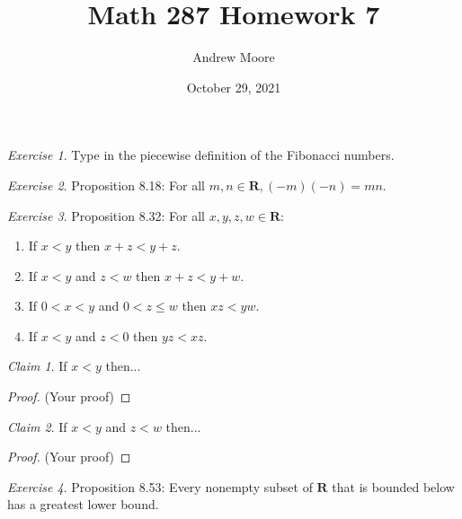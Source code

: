 \documentclass[12pt,oneside]{amsart}
\title{Math 287 Homework 7}
\author{Andrew Moore}
\date{October 29, 2021} %
\theoremstyle{remark}
\newtheorem{exer}{Exercise}
\newtheorem{claim}{Claim}[exer]
\newcommand{\bfR}{\mathbf{R}}
\begin{document}
\maketitle

\begin{exer}
Type in the piecewise definition of the Fibonacci numbers.
\end{exer}

\newpage
\begin{exer}
Proposition 8.18: For all $m,n \in \bfR, (-m)(-n) = mn$.
\end{exer}

\newpage
\begin{exer}
Proposition 8.32: For all $x,y,z,w \in \bfR$:
\begin{enumerate}
  \item If $x < y$ then $x + z < y + z$.
  \item If $x < y$ and $z < w$ then $x + z < y + w$.
  \item If $0 < x < y$ and $0 < z \leq w$ then $xz < yw$.
  \item If $x < y$ and $z < 0$ then $yz < xz$.
\end{enumerate}

\end{exer}

\begin{claim}
If $x < y$ then...
\end{claim}
\begin{proof}
(Your proof)
\end{proof}

\begin{claim}
If $x < y$ and $z < w$ then...
\end{claim}
\begin{proof}
(Your proof)
\end{proof}

\newpage
\begin{exer}
Proposition 8.53: Every nonempty subset of $\bfR$ that is bounded below has a greatest lower bound. %
\end{exer}
\end{document}
